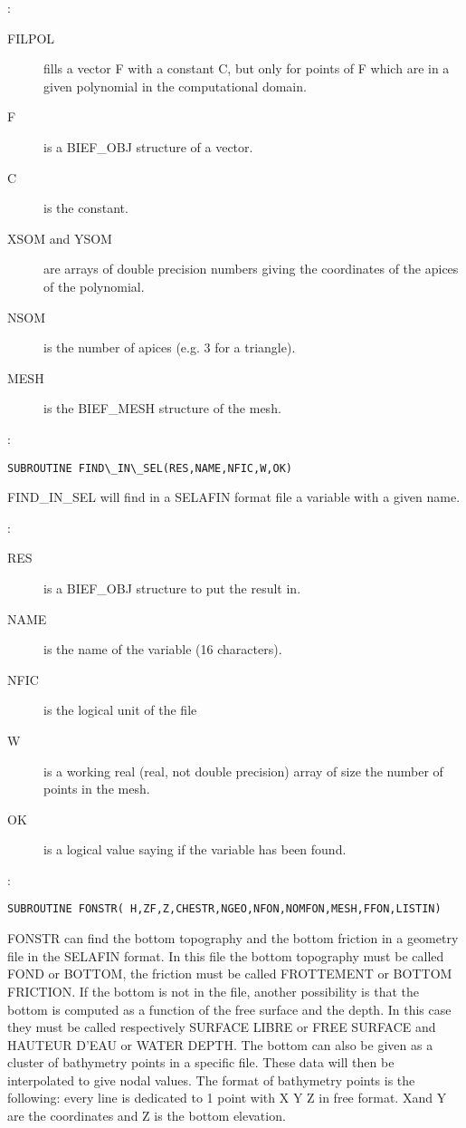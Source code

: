 :
\begin{description}
  \item [FILPOL] fills a vector F with a constant C, but only for points of F
    which are in a given polynomial in the computational domain.
  \item [F] is a BIEF\_OBJ structure of a vector.
  \item [C] is the constant.
  \item [XSOM and YSOM] are arrays of double precision numbers giving the
    coordinates of the apices of the polynomial.
  \item [NSOM] is the number of apices (e.g. 3 for a triangle).
  \item [MESH] is the BIEF\_MESH structure of the mesh.
\end{description}

:
\begin{lstlisting}[language=TelFortran]
SUBROUTINE FIND\_IN\_SEL(RES,NAME,NFIC,W,OK)
\end{lstlisting}

FIND\_IN\_SEL will find in a SELAFIN format file a variable with a given name.

:
\begin{description}
  \item [RES] is a BIEF\_OBJ structure to put the result in.
  \item [NAME] is the name of the variable (16 characters).
  \item [NFIC] is the logical unit of the file
  \item [W] is a working real (real, not double precision) array of size the number of points in the mesh.
  \item [OK] is a logical value saying if the variable has been found.
\end{description}

:
\begin{lstlisting}[language=TelFortran]
SUBROUTINE FONSTR( H,ZF,Z,CHESTR,NGEO,NFON,NOMFON,MESH,FFON,LISTIN)
\end{lstlisting}

FONSTR can find the bottom topography and the bottom friction in a geometry
file in the SELAFIN format. In this file the bottom topography must be called
FOND or BOTTOM, the friction must be called FROTTEMENT or BOTTOM FRICTION. If
the bottom is not in the file, another possibility is that the bottom is
computed as a function of the free surface and the depth. In this case they
must be called respectively SURFACE LIBRE or FREE SURFACE and HAUTEUR D'EAU or
WATER DEPTH. The bottom can also be given as a cluster of bathymetry points in
a specific file. These data will then be interpolated to give nodal values. The
format of bathymetry points is the following: every line is dedicated to 1
point with  X Y Z  in free format. Xand Y are the coordinates and Z is the
bottom elevation.

